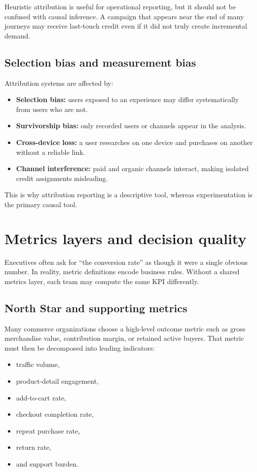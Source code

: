 Heuristic attribution is useful for operational reporting, but it should not be confused with causal inference.
A campaign that appears near the end of many journeys may receive last-touch credit even if it did not truly create incremental demand.

\subsection{Selection bias and measurement bias}
Attribution systems are affected by:
\begin{itemize}
  \item \textbf{Selection bias:} users exposed to an experience may differ systematically from users who are not.
  \item \textbf{Survivorship bias:} only recorded users or channels appear in the analysis.
  \item \textbf{Cross-device loss:} a user researches on one device and purchases on another without a reliable link.
  \item \textbf{Channel interference:} paid and organic channels interact, making isolated credit assignments misleading.
\end{itemize}

This is why attribution reporting is a descriptive tool, whereas experimentation is the primary causal tool.

\section{Metrics layers and decision quality}
Executives often ask for ``the conversion rate'' as though it were a single obvious number.
In reality, metric definitions encode business rules.
Without a shared metrics layer, each team may compute the same KPI differently.

\subsection{North Star and supporting metrics}
Many commerce organizations choose a high-level outcome metric such as gross merchandise value, contribution margin, or retained active buyers.
That metric must then be decomposed into leading indicators:
\begin{itemize}
  \item traffic volume,
  \item product-detail engagement,
  \item add-to-cart rate,
  \item checkout completion rate,
  \item repeat purchase rate,
  \item return rate,
  \item and support burden.
\end{itemize}

